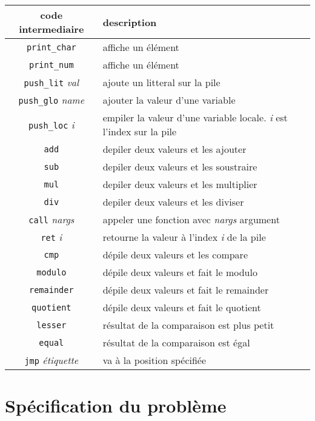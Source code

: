 \documentclass[12pt]{article}
\begin{document}
\begin{table}[h]
	\begin{tabular}{|c|l|}
		\hline
		code intermediaire & description \\ \hline
		\texttt{print\_char} & affiche un élément \\ \hline
		\texttt{print\_num} & affiche un élément \\ \hline
		
		\texttt{push\_lit} \emph{val}& ajoute un litteral sur la pile\\ \hline
		\texttt{push\_glo} \emph{name} & ajouter la valeur d'une variable\\ \hline
		\texttt{push\_loc} \emph{i} & empiler la valeur d'une variable locale. \emph{i} est l'index sur la pile\\ \hline
		\texttt{add}	& depiler deux valeurs et les ajouter \\ \hline
		\texttt{sub}	& depiler deux valeurs et les soustraire \\ \hline
		\texttt{mul}	& depiler deux valeurs et les multiplier \\ \hline
		\texttt{div}	& depiler deux valeurs et les diviser \\ \hline
		\texttt{call} \emph{nargs} & appeler une fonction avec \emph{nargs} argument\\ \hline
		\texttt{ret} \emph{i} & retourne la valeur à l'index \emph{i} de la pile\\  \hline
		\texttt{cmp} & dépile deux valeurs et les compare \\ \hline
		\texttt{modulo} & dépile deux valeurs et fait le modulo \\ \hline
        \texttt{remainder} & dépile deux valeurs et fait le remainder \\ \hline
        \texttt{quotient} & dépile deux valeurs et fait le quotient \\ \hline
        \texttt{lesser} & résultat de la comparaison est plus petit \\ \hline
        \texttt{equal} & résultat de la comparaison est égal \\ \hline
        \texttt{jmp} \emph{étiquette} & va à la position spécifiée\\ \hline 
	\end{tabular}
\end{table}

\newpage

\section{Spécification du problème}
\end{document}
